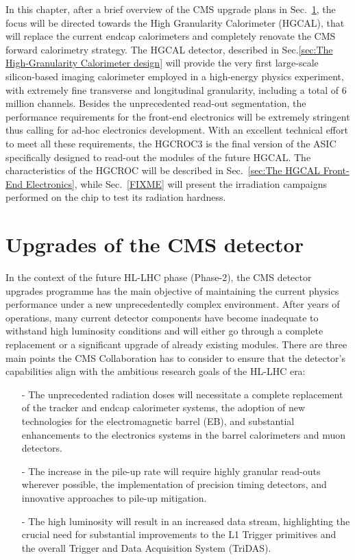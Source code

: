 \bigbreak

In this chapter, after a brief overview of the CMS upgrade plans in Sec.~\ref{sec:Upgrades of the CMS detector}, the focus will be directed towards the High Granularity Calorimeter (HGCAL), that will replace the current endcap calorimeters and completely renovate the CMS forward calorimetry strategy. The HGCAL detector, described in Sec.\ref{sec:The High-Granularity Calorimeter design} will provide the very first large-scale silicon-based imaging calorimeter employed in a high-energy physics experiment, with extremely fine transverse and longitudinal granularity, including a total of 6 million channels. Besides the unprecedented read-out segmentation, the performance requirements for the front-end electronics will be extremely stringent thus calling for ad-hoc electronics development. With an excellent technical effort to meet all these requirements, the HGCROC3 is the final version of the ASIC specifically designed to read-out the modules of the future HGCAL. 
The characteristics of the HGCROC will be described in Sec.~\ref{sec:The HGCAL Front-End Electronics}, while Sec.~\ref{FIXME} will present the irradiation campaigns performed on the chip to test its radiation hardness. 

\section{Upgrades of the CMS detector}
\label{sec:Upgrades of the CMS detector}

In the context of the future HL-LHC phase (Phase-2), the CMS detector upgrades programme has the main objective of maintaining the current physics performance under a new unprecedentedly complex environment. 
After years of operations, many current detector components have become inadequate to withstand high luminosity conditions and will either go through a complete replacement or a significant upgrade of already existing modules. There are three main points the CMS Collaboration has to consider to ensure that the detector's capabilities align with the ambitious research goals of the HL-LHC era:
\begin{itemize}
    \item [-] The unprecedented radiation doses will necessitate a complete replacement of the tracker and endcap calorimeter systems, the adoption of new technologies for the electromagnetic barrel (EB), and substantial enhancements to the electronics systems in the barrel calorimeters and muon detectors.
    \item [-] The increase in the pile-up rate will require highly granular read-outs wherever possible, the implementation of precision timing detectors, and innovative approaches to pile-up mitigation.
    \item [-] The high luminosity will result in an increased data stream, highlighting the crucial need for substantial improvements to the L1 Trigger primitives and the overall Trigger and Data Acquisition System (TriDAS).
\end{itemize}

